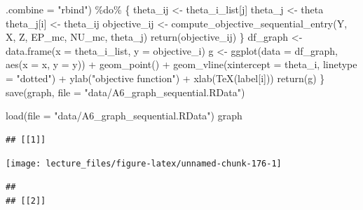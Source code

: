 \documentclass[
]{book}
\newenvironment{Shaded}{\begin{snugshade}}{\end{snugshade}}
\newcommand{\AttributeTok}[1]{\textcolor[rgb]{0.77,0.63,0.00}{#1}}
\newcommand{\FunctionTok}[1]{\textcolor[rgb]{0.00,0.00,0.00}{#1}}
\newcommand{\NormalTok}[1]{#1}
\newcommand{\OtherTok}[1]{\textcolor[rgb]{0.56,0.35,0.01}{#1}}
\newcommand{\SpecialCharTok}[1]{\textcolor[rgb]{0.00,0.00,0.00}{#1}}
\newcommand{\StringTok}[1]{\textcolor[rgb]{0.31,0.60,0.02}{#1}}
\begin{document}
\begin{Shaded}
\begin{Highlighting}[]
             \AttributeTok{.combine =} \StringTok{"rbind"}\NormalTok{) }\SpecialCharTok{\%do\%}\NormalTok{ \{}
\NormalTok{               theta\_ij }\OtherTok{\textless{}{-}}\NormalTok{ theta\_i\_list[j]}
\NormalTok{               theta\_j }\OtherTok{\textless{}{-}}\NormalTok{ theta}
\NormalTok{               theta\_j[i] }\OtherTok{\textless{}{-}}\NormalTok{ theta\_ij}
\NormalTok{               objective\_ij }\OtherTok{\textless{}{-}} 
                 \FunctionTok{compute\_objective\_sequential\_entry}\NormalTok{(Y, X, Z, EP\_mc, NU\_mc, theta\_j)}
               \FunctionTok{return}\NormalTok{(objective\_ij)}
\NormalTok{             \}}
\NormalTok{  df\_graph }\OtherTok{\textless{}{-}} \FunctionTok{data.frame}\NormalTok{(}\AttributeTok{x =}\NormalTok{ theta\_i\_list, }\AttributeTok{y =}\NormalTok{ objective\_i) }
\NormalTok{  g }\OtherTok{\textless{}{-}} \FunctionTok{ggplot}\NormalTok{(}\AttributeTok{data =}\NormalTok{ df\_graph, }\FunctionTok{aes}\NormalTok{(}\AttributeTok{x =}\NormalTok{ x, }\AttributeTok{y =}\NormalTok{ y)) }\SpecialCharTok{+} 
    \FunctionTok{geom\_point}\NormalTok{() }\SpecialCharTok{+}
    \FunctionTok{geom\_vline}\NormalTok{(}\AttributeTok{xintercept =}\NormalTok{ theta\_i, }\AttributeTok{linetype =} \StringTok{"dotted"}\NormalTok{) }\SpecialCharTok{+}
    \FunctionTok{ylab}\NormalTok{(}\StringTok{"objective function"}\NormalTok{) }\SpecialCharTok{+} \FunctionTok{xlab}\NormalTok{(}\FunctionTok{TeX}\NormalTok{(label[i]))}
  \FunctionTok{return}\NormalTok{(g)}
\NormalTok{\}}
\FunctionTok{save}\NormalTok{(graph, }\AttributeTok{file =} \StringTok{"data/A6\_graph\_sequential.RData"}\NormalTok{)}
\end{Highlighting}
\end{Shaded}

\begin{Shaded}
\begin{Highlighting}[]
\FunctionTok{load}\NormalTok{(}\AttributeTok{file =} \StringTok{"data/A6\_graph\_sequential.RData"}\NormalTok{)}
\NormalTok{graph}
\end{Highlighting}
\end{Shaded}

\begin{verbatim}
## [[1]]
\end{verbatim}

\begin{center}\texttt{[image: lecture\_files/figure-latex/unnamed-chunk-176-1]} \end{center}

\begin{verbatim}
## 
## [[2]]
\end{verbatim}
\end{document}
